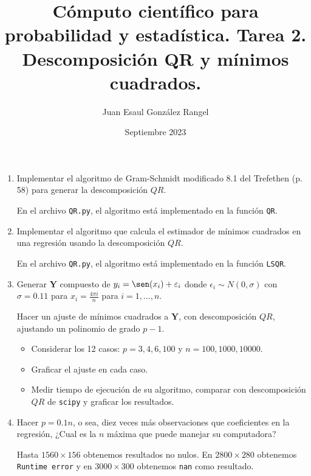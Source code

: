 \documentclass{article}
\title{Cómputo científico para probabilidad y estadística. Tarea 2.\\
Descomposición QR y mínimos cuadrados.}
\author{Juan Esaul González Rangel}
\date{Septiembre 2023}
\begin{document}
\maketitle


\begin{enumerate}

    \item Implementar el algoritmo de Gram-Schmidt modificado 8.1 del Trefethen (p. 58) para generar 
    la descomposición $QR$.

    En el archivo \texttt{QR.py}, el algoritmo está implementado en la función \texttt{QR}. 

    \item Implementar el algoritmo que calcula el estimador de mínimos cuadrados
    en una regresión usando la descomposición $QR$.

    En el archivo \texttt{QR.py}, el algoritmo está implementado en la función \texttt{LSQR}. 

    \item Generar $\mathbf Y$ compuesto de $y_i = \sen(x_i) + \epsilon_i$ donde 
    $\epsilon_i \sim N (0, \sigma)$ con $\sigma = 0.11$ para $x_i = \frac{4\pi i}n$ para 
    $i = 1, \dots , n$.

    Hacer un ajuste de mínimos cuadrados a $\mathbf Y$, con descomposición $QR$, ajustando un polinomio 
    de grado $p - 1$.

    \begin{itemize}
        \item Considerar los 12 casos: $p = 3, 4, 6, 100$ y $n = 100, 1000, 10000$.
        


        \item Graficar el ajuste en cada caso.
        


        \item Medir tiempo de ejecución de su algoritmo, comparar con descomposición $QR$ de 
        \texttt{scipy} y graficar los resultados.


    \end{itemize}


    \item Hacer $p = 0.1n$, o sea, diez veces más observaciones que coeficientes en la regresión, 
    ¿Cual es la $n$ máxima que puede manejar su computadora?

    Hasta $1560 \times 156$ obtenemos resultados no nulos. En $2800 \times 280$ obtenemos 
    \texttt{Runtime error} y en $3000\times 300$ obtenemos \texttt{nan} como resultado.
   
\end{enumerate}




 
\end{document}

